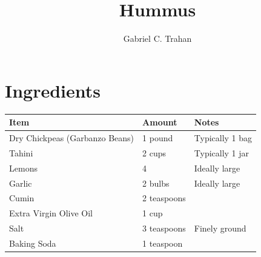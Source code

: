 \documentclass[10pt]{article}
\title{Hummus}
\author{Gabriel C. Trahan}
\begin{document}
    \maketitle

    \section{Ingredients}

        \begin{tabularx}{\textwidth}{|>{\raggedright\arraybackslash}X|l|>{\raggedright\arraybackslash}X|}
            \hline
            Item & Amount & Notes \\
            \hline
            Dry Chickpeas (Garbanzo Beans)  & 1 pound       & Typically 1 bag   \\
            Tahini                          & 2 cups        & Typically 1 jar   \\
            Lemons                          & 4             & Ideally large     \\
            Garlic                          & 2 bulbs       & Ideally large     \\
            Cumin                           & 2 teaspoons   &                   \\
            Extra Virgin Olive Oil          & 1 cup         &                   \\
            Salt                            & 3 teaspoons   & Finely ground     \\
            Baking Soda                     & 1 teaspoon    &                   \\
            \hline
        \end{tabularx}
\end{document}
